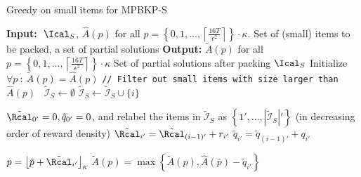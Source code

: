 \documentclass[11pt]{article}
\begin{document}
\begin{algorithm}[h]
\footnotesize
\caption{Greedy on small items for MPBKP-S}
\label{alg:FPTAS_nTlogn_small2}
\begin{algorithmic}[1]
	\Statex \textbf{Input:} $\ \Ical_S$, $\hat{A}(p)$ for all $p = \left\{ 0, 1, \ldots,\left\lceil\frac{16T}{\epsilon^2}\right\rceil \right\} \cdot \kappa $.  \Comment Set of (small) items to be packed, a set of partial solutions
	\Statex \textbf{Output:} $\widetilde{A}(p)$ for all $p = \left\{ 0, 1, \ldots,\left\lceil\frac{16T}{\epsilon^2}\right\rceil \right\} \cdot \kappa $ \Comment Set of partial solutions after packing $\Ical_S$
	\State Initialize $\forall p \ : \ \widetilde{A}(p) = \hat{A}(p)$ 
	\Statex  \texttt{// Filter out small items with size larger than $\hat{A}(p)$ } 
	\State $\widetilde{\mathcal{I}}_S\gets\emptyset$
	\State $\widetilde{\mathcal{I}}_S\gets \widetilde{\mathcal{I}}_S\cup \{i\}$
	\EndIf
	\EndFor
	
	
	
	\State $\tilde{\Rcal}_{0'} = 0, \tilde{q}_{0'} = 0$, and relabel the items in $\widetilde{\mathcal{I}}_S$ as $\left\{1',\ldots,|\widetilde{\mathcal{I}}_S|'\right\}$ (in decreasing order of reward density)
	\State  $\tilde{\Rcal}_{i'} = \tilde{\Rcal}_{(i-1)'} + r_{i'}$
	\State  $\tilde{q}_{i'} = \tilde{q}_{(i-1)'} + q_{i'}$
	\EndFor
	
	\State $p = \left\lfloor \bar{p} + \tilde{\Rcal}_{i'}\right\rfloor_\kappa$
	\State $\widetilde{A}({p}) = \max\left\{\widetilde{A}(p) , \hat{A}(\bar{p}) - \tilde{q}_{i'}  \right\}$
	\EndIf
	\EndFor
	\EndFor 
\end{algorithmic}
\end{algorithm}
\end{document}
